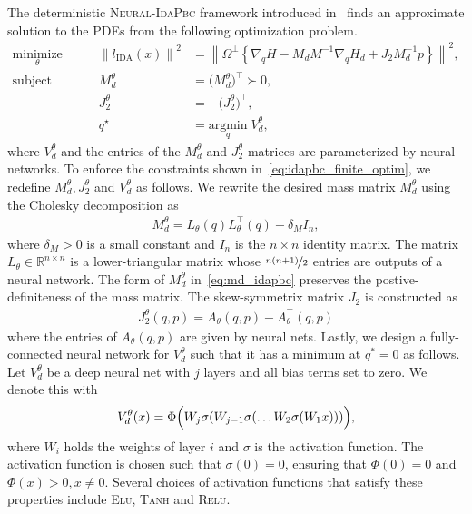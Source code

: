 The deterministic \textsc{Neural-IdaPbc} framework introduced
in~\cite{sirichotiyakul2022data} finds an approximate solution to the PDEs from the
following optimization problem.
\begin{equation}
  \begin{aligned}
      \underset{\theta }{\textrm{minimize}} 
      &&\quad \left\| l_{\textrm{IDA}} (x) \right\|^2 &= \left\| \Omega^\perp \left\{ \nabla_qH - M_dM^{-1} \nabla_qH_d + J_2M_d^{-1}p \right\} \right\|^2, \\
      \textrm{subject to}
      &&\quad M_d^\theta &= \big( M_d^\theta \big)^\top \succ 0, \\
      &&\quad J_2^\theta &= -\big( J_2^\theta \big)^\top, \\
      &&\quad q^\star &= \underset{q}{\textrm{argmin}}\; V_d^\theta,
  \end{aligned}    
  \label{eq:idapbc_finite_optim}%
\end{equation}
where $V^\theta_d$ and the entries of the $M^\theta_d$ and $J^\theta_2$ matrices
are parameterized by neural networks. 
%
To enforce the constraints shown in~\eqref{eq:idapbc_finite_optim}, we redefine
$M^\theta_d, J^\theta_2$ and $V^\theta_d$ as follows.
%
We rewrite the desired mass matrix $M^\theta_d$ using the Cholesky decomposition as
\begin{align}
  M^\theta_d = L_{\theta}(q)L_{\theta}^\top(q) + \delta_M I_n,
  \label{eq:md_idapbc}
\end{align}
\noindent where $\delta_M > 0$ is a small constant and $I_n$ is the $n \times n$
identity matrix.
%
The matrix $L_{\theta} \in \mathbb{R}^{n \times n}$ is a lower-triangular matrix
whose $\nicefrac{n(n+1)}{2}$ entries are outputs of a neural network. 
%
The form of $M_d^\theta$ in~\eqref{eq:md_idapbc} preserves the
postive-definiteness of the mass matrix.
%
The skew-symmetrix matrix $J_2$ is constructed as 
\begin{align*}
  J_2^\theta(q, p) = A_\theta(q, p) - A^\top_\theta(q, p)
\end{align*}
\noindent where the entries of $A_{\theta}(q, p)$ are given by neural nets.
%
Lastly, we design a fully-connected neural network for $V^\theta_d$ such that it
has a minimum at $q^*=0$ as follows.
%
Let $V^\theta_d$ be a deep neural net with $j$ layers and all bias terms set to
zero. We denote this with
\begin{equation}
  V_d^\theta(x) = \Phi \Bigl( W_j\sigma(W_{j-1}\sigma(\ldots W_2\sigma(W_1x))) \Bigr),
  \label{eq:Vdnet_constraint}
\end{equation}
\noindent where $W_i$ holds the weights of layer $i$ and $\sigma$ is the activation function.
%
The activation function is chosen such that $\sigma(0) = 0$, ensuring that
$\Phi(0) = 0$ and $\Phi(x) > 0, x \ne 0$.
%
Several choices of activation functions that satisfy these properties include
\textsc{Elu}, \textsc{Tanh} and \textsc{Relu}.
%


